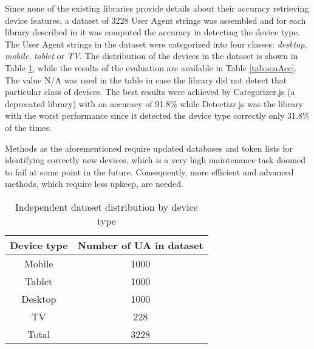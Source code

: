 Since none of the existing libraries provide details about their accuracy retrieving device features, a dataset \cite{uagit} of 3228 User Agent strings was assembled and for each library described in \cite{dominguez2019methods} it was computed the accuracy in detecting the device type. The User Agent strings in the dataset were categorized into four classes: \emph{desktop}, \emph{mobile}, \emph{tablet} or \emph{TV}. The distribution of the devices in the dataset is shown in Table \ref{tab:indist}, while the results of the evaluation are available in Table \ref{tab:soaAcc}. The value N/A was used in the table in case the library did not detect that particular class of devices. The best results were achieved by Categorizer.js (a deprecated library) with an accuracy of 91.8\% while Detectizr.js was the library with the worst performance since it detected the device type correctly only 31.8\% of the times. 

Methods as the aforementioned require updated databases and token lists for identifying correctly new devices, which is a very high maintenance task doomed to fail at some point in the future. Consequently, more efficient and advanced methods, which require less upkeep, are needed.


\begin{table}
	\centering
	\caption{Independent dataset distribution by device type}
	\label{tab:indist}
	\begin{tabular}{||c|c||}
		\hline
		\textbf{Device type}&\textbf{Number of UA in dataset} \\
		\hline
		Mobile & 1000\\
		Tablet & 1000\\
		Desktop & 1000\\
		TV & 228 \\
		\hline
		Total & 3228\\
		\hline
	\end{tabular}
\end{table}

